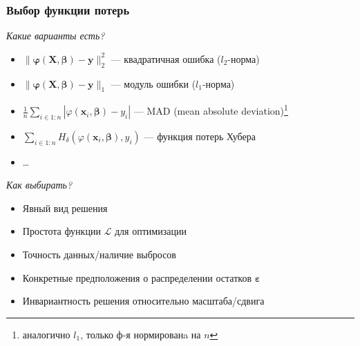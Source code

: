 \documentclass[ucs, notheorems, handout]{beamer}
\newcommand{\betaa}{\bm{\beta}}
\begin{document}
\begin{frame}
    \frametitle{Выбор функции потерь}

\textit{Какие варианты есть?}
\begin{itemize}
	\item $\|\bm \varphi(\bm X, \betaa) - \bm y\|^2_2$ --- квадратичная ошибка ($l_2$-норма)
	\item $\|\bm \varphi(\bm X, \betaa) - \bm y\|_1$ --- модуль ошибки ($l_1$-норма)
	\item $\frac{1}{n}\sum_{i \in 1:n}|\varphi(\mathbf x_i, \betaa) - y_i|$ --- MAD (mean absolute deviation)\footnote{аналогично $l_1$, только ф-я нормированa на $n$}
	\item $\sum_{i \in 1:n} H_\delta(\varphi(\mathbf x_i, \betaa), y_i)$ --- функция потерь Хубера
	\item \dots
\end{itemize}
    \vspace{3mm}
\textit{Как выбирать?}
\begin{itemize}
	\item Явный вид решения 
	\item Простота функции $\mathcal L$ для оптимизации
	\item Точность данных/наличие выбросов
	\item Конкретные предположения о распределении остатков $\bm \varepsilon$
	\item Инвариантность решения относительно масштаба/сдвига
\end{itemize}

    \note{

    }
\end{frame}
\end{document}
